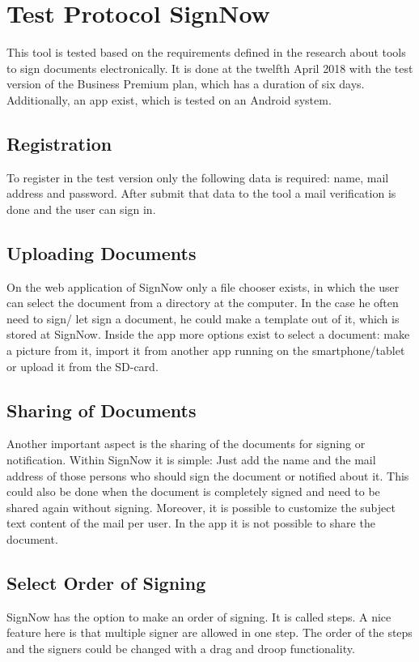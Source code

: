 \section{Test Protocol SignNow}
\label{sec:signnow}
This tool is tested based on the requirements defined in the research about tools to sign documents electronically. It is done at the twelfth April 2018 with the test version of the Business Premium plan, which has a duration of six days. Additionally, an \gls{app} exist, which is tested on an Android system.

\subsection{Registration}
To register in the test version only the following data is required: name, mail address and password. After submit that data to the tool a mail verification is done and the user can sign in.

\subsection{Uploading Documents}
On the web application of SignNow only a file chooser exists, in which the user can select the document from a directory at the computer. In the case he often need to sign/ let sign a document, he could make a template out of it, which is stored at SignNow. Inside the \gls{app} more options exist to select a document: make a picture from it, import it from another \gls{app} running on the smartphone/tablet or upload it from the SD-card.  

\subsection{Sharing of Documents}
Another important aspect is the sharing of the documents for signing or notification. Within SignNow it is simple: Just add the name and the mail address of those persons who should sign the document or notified about it. This could also be done when the document is completely signed and need to be shared again without signing. Moreover, it is possible to customize the subject text content of the mail per user. In the \gls{app} it is not possible to share the document.

\subsection{Select Order of Signing}
SignNow has the option to make an order of signing. It is called steps. A nice feature here is that multiple signer are allowed in one step. The order of the steps and the signers could be changed with a drag and droop functionality.

